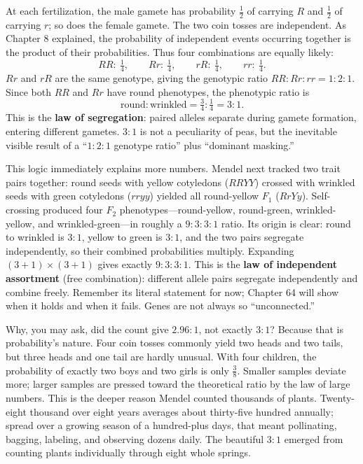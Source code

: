 \begin{qiaoliang}
At each fertilization, the male gamete has probability $\frac{1}{2}$ of carrying $R$ and $\frac{1}{2}$ of carrying $r$; so does the female gamete. The two coin tosses are independent. As Chapter 8 explained, the probability of independent events occurring together is the product of their probabilities. Thus four combinations are equally likely:
\[
RR:\ \tfrac{1}{4},\qquad Rr:\ \tfrac{1}{4},\qquad rR:\ \tfrac{1}{4},\qquad rr:\ \tfrac{1}{4}.
\]
$Rr$ and $rR$ are the same genotype, giving the genotypic ratio $RR:Rr:rr = 1:2:1$. Since both $RR$ and $Rr$ have round phenotypes, the phenotypic ratio is
\[
\text{round}:\text{wrinkled} = \tfrac{3}{4}:\tfrac{1}{4} = 3:1.
\]
This is the \textbf{law of segregation}: paired alleles separate during gamete formation, entering different gametes. $3:1$ is not a peculiarity of peas, but the inevitable visible result of a ``$1:2:1$ genotype ratio'' plus ``dominant masking.''
\end{qiaoliang}

This logic immediately explains more numbers. Mendel next tracked two trait pairs together: round seeds with yellow cotyledons ($RRYY$) crossed with wrinkled seeds with green cotyledons ($rryy$) yielded all round-yellow $F_1$ ($RrYy$). Self-crossing produced four $F_2$ phenotypes---round-yellow, round-green, wrinkled-yellow, and wrinkled-green---in roughly a $9:3:3:1$ ratio. Its origin is clear: round to wrinkled is $3:1$, yellow to green is $3:1$, and the two pairs segregate independently, so their combined probabilities multiply. Expanding $(3+1)\times(3+1)$ gives exactly $9:3:3:1$. This is the \textbf{law of independent assortment} (free combination): different allele pairs segregate independently and combine freely. Remember its literal statement for now; Chapter 64 will show when it holds and when it fails. Genes are not always so ``unconnected.''

Why, you may ask, did the count give $2.96:1$, not exactly $3:1$? Because that is probability's nature. Four coin tosses commonly yield two heads and two tails, but three heads and one tail are hardly unusual. With four children, the probability of exactly two boys and two girls is only $\frac{3}{8}$. Smaller samples deviate more; larger samples are pressed toward the theoretical ratio by the law of large numbers. This is the deeper reason Mendel counted thousands of plants. Twenty-eight thousand over eight years averages about thirty-five hundred annually; spread over a growing season of a hundred-plus days, that meant pollinating, bagging, labeling, and observing dozens daily. The beautiful $3:1$ emerged from counting plants individually through eight whole springs.

